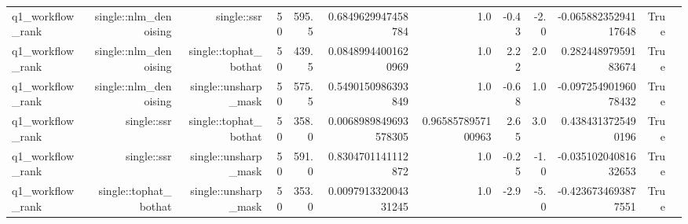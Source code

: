 \begin{tabular}{lrrrrrrrrrrr}
q1\_workflow\_rank & single::nlm\_denoising & single::ssr & 50 & 595.5 & 0.6849629947458784 & 1.0 & -0.43 & -2.0 & -0.06588235294117648 & True &  \\
q1\_workflow\_rank & single::nlm\_denoising & single::tophat\_bothat & 50 & 439.5 & 0.08489944001620969 & 1.0 & 2.22 & 2.0 & 0.28244897959183674 & True &  \\
q1\_workflow\_rank & single::nlm\_denoising & single::unsharp\_mask & 50 & 575.5 & 0.5490150986393849 & 1.0 & -0.68 & 1.0 & -0.09725490196078432 & True &  \\
q1\_workflow\_rank & single::ssr & single::tophat\_bothat & 50 & 358.0 & 0.0068989849693578305 & 0.9658578957100963 & 2.65 & 3.0 & 0.4384313725490196 & True &  \\
q1\_workflow\_rank & single::ssr & single::unsharp\_mask & 50 & 591.0 & 0.8304701141112872 & 1.0 & -0.25 & -1.0 & -0.03510204081632653 & True &  \\
q1\_workflow\_rank & single::tophat\_bothat & single::unsharp\_mask & 50 & 353.0 & 0.009791332004331245 & 1.0 & -2.9 & -5.0 & -0.4236734693877551 & True &  \\
\hline
\end{tabular}
